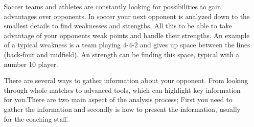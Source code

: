Soccer teams and athletes are constantly looking for possibilities to gain advantages over opponents. In soccer your next opponent is analyzed down to the smallest details to find weaknesses and strengths. All this to be able to take advantage of your opponents weak points and handle their strengths. An example of a typical weakness is a team playing 4-4-2 and gives up space between the lines (back-four and midfield). An strength can be finding this space, typical with a number 10 player.

There are several ways to gather information about your opponent. From looking through whole matches to advanced tools, which can highlight key information for you.There are two main aspect of the analysis process; First you need to gather the information and secondly is how to present the information, usually for the coaching staff.